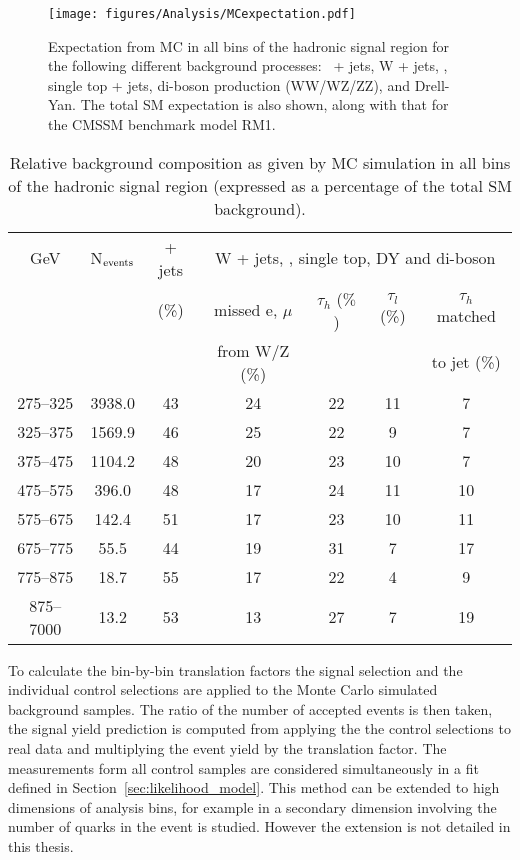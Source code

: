 \begin{figure}[ht|]
  \centering
    \texttt{[image: figures/Analysis/MCexpectation.pdf]}
  \caption{Expectation from MC in all bins of the hadronic signal
      region for the following different background processes: \HepProcess{\PZ\to\nu\nu}\
      + jets, W + jets, \HepProcess{\Ptop\APtop}, single top + jets, di-boson production
      (WW/WZ/ZZ), and Drell-Yan. The total SM expectation is also
      shown, along with that for the CMSSM benchmark model RM1.}
  \label{fig:figures_Analysis_MCexpectation}
\end{figure}

\begin{table}[th|]
  \caption{Relative background composition as given by MC simulation
    in all bins of the hadronic signal region (expressed as a
    percentage of the total SM background).} 
  \label{tab:bg-compositions}
  \centering
  \begin{tabular}{ |c|c|c|c|c|c|c| }
    \hline
    \HT GeV & N$_{\rm events}$ & \HepProcess{\PZ\to\nu\nu} + jets & \multicolumn{4}{c}{W + jets, \HepProcess{\Ptop\APtop}, single top, DY and di-boson}  \\ [0.5ex]
    \cline{4-7}
    &                & (\%)           & missed e, $\mu$ & $\tau_{h}$ ($\%$) & $\tau_{l}$ (\%) & $\tau_{h}$ matched \\
    &                &                & from W/Z (\%)   &               &               & to jet (\%)      \\ [0.5ex]
    \hline
    275--325      & 3938.0 & 43 & 24 & 22 & 11 & 7  \\ 
    325--375      & 1569.9 & 46 & 25 & 22 & 9  & 7  \\ 
    375--475      & 1104.2 & 48 & 20 & 23 & 10 & 7  \\ 
    475--575      & 396.0  & 48 & 17 & 24 & 11 & 10 \\ 
    575--675      & 142.4  & 51 & 17 & 23 & 10 & 11 \\ 
    675--775      & 55.5   & 44 & 19 & 31 & 7  & 17 \\ 
    775--875      & 18.7   & 55 & 17 & 22 & 4  & 9  \\ 
    875--7000     & 13.2   & 53 & 13 & 27 & 7  & 19 \\ 
    \hline
  \end{tabular}
\end{table}

To calculate the bin-by-bin translation factors the signal selection and the 
individual control selections are applied to the Monte Carlo simulated 
background samples. The ratio of the number of accepted events is then taken, 
the signal yield prediction is computed from applying the the control 
selections to real data and multiplying the event yield by the translation 
factor. The measurements form all control samples are considered simultaneously 
in a fit defined in Section~\ref{sec:likelihood_model}. This method can be 
extended to high dimensions of analysis bins, for example in 
\cite{CMS-PAS-SUS-12-028} a secondary dimension involving the number 
of \HepProcess{\Pbottom} quarks in the event is studied. However the 
\HepProcess{\Pbottom} extension is not detailed in this thesis.


